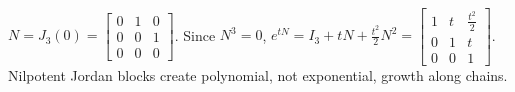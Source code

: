\begin{example} \label{ex:nilpotent-jordan-block-linear-evolution} \\
$N=J_3(0)=
\begin{bmatrix}
0&1&0\\
0&0&1\\
0&0&0
\end{bmatrix}$. Since $N^3=0$, $e^{tN}=I_3+tN+\frac{t^2}{2}N^2
=
\begin{bmatrix}
1&t&\frac{t^2}{2}\\
0&1&t\\
0&0&1
\end{bmatrix}$.\\
Nilpotent Jordan blocks create polynomial, not exponential, growth along chains.
\end{example}
